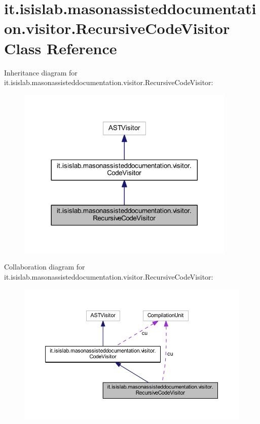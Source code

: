 \hypertarget{classit_1_1isislab_1_1masonassisteddocumentation_1_1visitor_1_1_recursive_code_visitor}{\section{it.\-isislab.\-masonassisteddocumentation.\-visitor.\-Recursive\-Code\-Visitor Class Reference}
\label{classit_1_1isislab_1_1masonassisteddocumentation_1_1visitor_1_1_recursive_code_visitor}
}


Inheritance diagram for it.\-isislab.\-masonassisteddocumentation.\-visitor.\-Recursive\-Code\-Visitor\-:\nopagebreak
\begin{figure}[H]
\begin{center}
\leavevmode
\includegraphics[width=296pt]{classit_1_1isislab_1_1masonassisteddocumentation_1_1visitor_1_1_recursive_code_visitor__inherit__graph}
\end{center}
\end{figure}


Collaboration diagram for it.\-isislab.\-masonassisteddocumentation.\-visitor.\-Recursive\-Code\-Visitor\-:\nopagebreak
\begin{figure}[H]
\begin{center}
\leavevmode
\includegraphics[width=350pt]{classit_1_1isislab_1_1masonassisteddocumentation_1_1visitor_1_1_recursive_code_visitor__coll__graph}
\end{center}
\end{figure}
